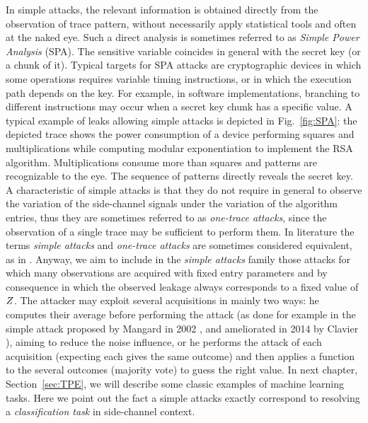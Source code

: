 In simple attacks, the relevant information is obtained directly from the observation of trace pattern, without necessarily apply statistical tools and often at the naked eye. Such a direct analysis is sometimes referred to as \emph{Simple Power Analysis} (SPA). The sensitive variable coincides in general with the secret key (or a chunk of it). Typical targets for SPA attacks are cryptographic devices in which some operations requires variable timing instructions, or in which the execution path depends on the key. For example, in software implementations, branching to different instructions may occur when a secret key chunk has a specific value. A typical example of leaks allowing simple attacks is depicted in Fig.~\ref{fig:SPA}: the depicted trace shows the power consumption of a device performing squares and multiplications while computing modular exponentiation to implement the RSA algorithm. Multiplications consume more than squares and patterns are recognizable to the eye. The sequence of patterns directly reveals the secret key. A characteristic of simple attacks is that they do not require in general to observe the variation of the side-channel signals under the variation of the algorithm entries, thus they are sometimes referred to as \emph{one-trace attacks}, since the observation of a single trace may be sufficient to perform them. In literature the terms \emph{simple attacks} and \emph{one-trace attacks} are sometimes considered equivalent, as \eg in \cite{exponent2012rosetta}. Anyway, we aim to include in the \emph{simple attacks} family those attacks for which many observations are acquired with fixed entry parameters and by consequence in which the observed leakage always corresponds to a fixed value of $Z$. The attacker may exploit several acquisitions in mainly two ways: he computes their average before performing the attack (as done for example in the simple attack proposed by Mangard in 2002 \cite{mangard2002simple}, and ameliorated in 2014 by Clavier \etal \cite{clavier2014simple}), aiming to reduce the noise influence, or he performs the attack of each acquisition (expecting each gives the same outcome) and then applies a function to the several outcomes (\eg majority vote) to guess the right value. In next chapter, Section~\ref{sec:TPE}, we will describe some classic examples of machine learning tasks. Here we point out the fact a simple attacks exactly correspond to resolving a \emph{classification task} in side-channel context. 



